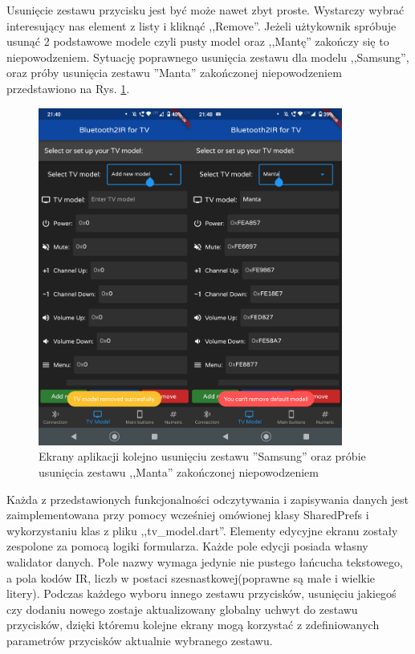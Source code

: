\documentclass[12pt,twoside]{article}
\begin{document}
Usunięcie zestawu przycisku jest być może nawet zbyt proste. Wystarczy wybrać interesujący nas element z listy i kliknąć ,,Remove''. Jeżeli użtykownik spróbuje usunąć 2 podstawowe modele czyli pusty model oraz ,,Mantę'' zakończy się to niepowodzeniem. Sytuację poprawnego usunięcia zestawu dla modelu ,,Samsung'', oraz próby usunięcia zestawu ''Manta'' zakończonej niepowodzeniem przedstawiono na Rys. \ref*{Fig:removingSamsung}.

\begin{figure}[ht]
   \centering
   \includegraphics[width=10cm]{images/removingSamsung.png}
   \caption{Ekrany aplikacji kolejno usunięciu zestawu ''Samsung'' oraz próbie usunięcia zestawu ,,Manta'' zakończonej niepowodzeniem}
   \label{Fig:removingSamsung}
\end{figure}

Każda z przedstawionych funkcjonalności odczytywania i zapisywania danych jest zaimplementowana przy pomocy wcześniej omówionej klasy SharedPrefs i wykorzystaniu klas z pliku ,,tv\_model.dart''. Elementy edycyjne ekranu zostały zespolone za pomocą logiki formularza. Każde pole edycji posiada własny walidator danych. Pole nazwy wymaga jedynie nie pustego łańcucha tekstowego, a pola kodów IR, liczb w postaci szesnastkowej(poprawne są małe i wielkie litery). Podczas każdego wyboru innego zestawu przycisków, usunięciu jakiegoś czy dodaniu nowego zostaje aktualizowany globalny uchwyt do zestawu przycisków, dzięki któremu kolejne ekrany mogą korzystać z zdefiniowanych parametrów przycisków aktualnie wybranego zestawu.
\end{document}

